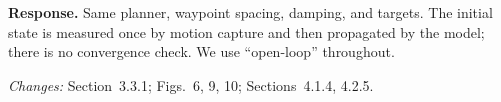 \textbf{Response.} Same planner, waypoint spacing, damping, and targets. The initial state is measured once by motion capture and then propagated by the model; there is no convergence check. We use ``open-loop'' throughout.

\textit{Changes:} Section~3.3.1; Figs.~6, 9, 10; Sections~4.1.4, 4.2.5.
